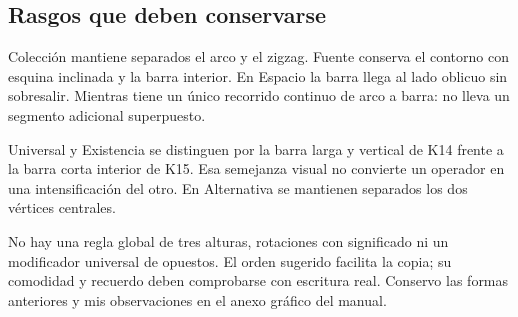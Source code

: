 

\subsection{Rasgos que deben conservarse}
Colección mantiene separados el arco y el zigzag. Fuente conserva el contorno
con esquina inclinada y la barra interior. En Espacio la barra llega al lado
oblicuo sin sobresalir. Mientras tiene un único recorrido continuo de arco a
barra: no lleva un segmento adicional superpuesto.

Universal y Existencia se distinguen por la barra larga y vertical de K14 frente
a la barra corta interior de K15. Esa semejanza visual no convierte un operador
en una intensificación del otro. En Alternativa se mantienen separados los dos
vértices centrales.

No hay una regla global de tres alturas, rotaciones con significado ni un
modificador universal de opuestos. El orden sugerido facilita la copia; su
comodidad y recuerdo deben comprobarse con escritura real. Conservo las formas anteriores
y mis observaciones en el anexo gráfico del manual.
